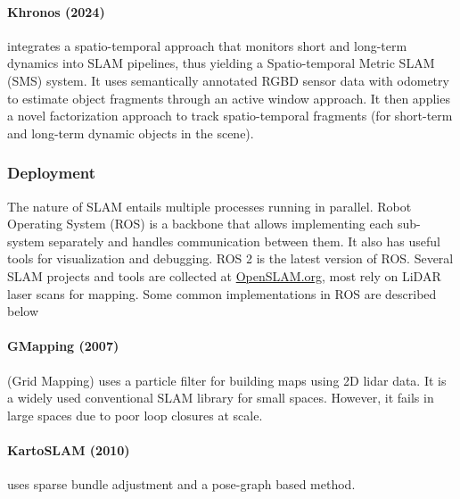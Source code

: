\paragraph{Khronos (2024) \cite{Schmid2024KhronosAU}} integrates a
spatio-temporal approach that monitors short and long-term dynamics
into SLAM pipelines, thus yielding a Spatio-temporal Metric SLAM (SMS)
system. It uses semantically annotated RGBD sensor data with odometry
to estimate object fragments through an active window approach. It
then applies a novel factorization approach to track spatio-temporal
fragments (for short-term and long-term dynamic objects in the scene).

\subsubsection{Deployment}

The nature of SLAM entails multiple processes running in parallel.
Robot Operating System (ROS) \cite{Quigley2009ROSAO} is a backbone
that allows implementing each sub-system separately and handles
communication between them. It also has useful tools for visualization
and debugging. ROS 2 \cite{Macenski2022RobotOS} is the latest version
of ROS. Several SLAM projects and tools are collected at
\href{https://openslam-org.github.io/}{OpenSLAM.org}, most rely on
LiDAR laser scans for mapping. Some common implementations in ROS are
described below

\paragraph{GMapping (2007) \cite{Grisetti2007ImprovedTF}} (Grid
Mapping) uses a particle filter for building maps using 2D lidar data.
It is a widely used conventional SLAM library for small spaces.
However, it fails in large spaces due to poor loop closures at scale.

\paragraph{KartoSLAM (2010) \cite{Konolige2010EfficientSP}} uses
sparse bundle adjustment and a pose-graph based method.


